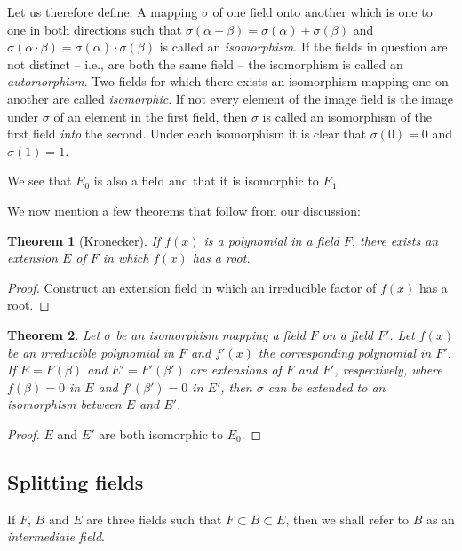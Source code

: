 \documentclass[11pt]{article}
\newtheorem{theo}{Theorem}
\theoremstyle{definition}
\begin{document}
Let us therefore define:
A mapping $\sigma$ of one field onto another which is one to one in both directions such that $\sigma(\alpha + \beta) = \sigma(\alpha) + \sigma(\beta)$ and $\sigma(\alpha \cdot \beta) = \sigma(\alpha) \cdot \sigma(\beta)$ is called an \emph{isomorphism}.
If the fields in question are not distinct -- i.e., are both the same field -- the isomorphism is called an \emph{automorphism}.
Two fields for which there exists an isomorphism mapping one on another are called \emph{isomorphic}.
If not every element of the image field is the image under $\sigma$ of an element in the first field, then $\sigma$ is called an isomorphism of the first field \emph{into} the second.
Under each isomorphism it is clear that $\sigma(0) = 0$ and $\sigma(1) = 1$.

We see that $E_0$ is also a field and that it is isomorphic to $E_1$.

We now mention a few theorems that follow from our discussion:

\begin{theo}[Kronecker]
\label{theo:se}
If $f(x)$ is a polynomial in a field $F$, there exists an extension $E$ of $F$ in which $f(x)$ has a root.
\end{theo}

\begin{proof}
Construct an extension field in which an irreducible factor of $f(x)$ has a root.
\end{proof}

\begin{theo}
\label{theo:ei}
Let $\sigma$ be an isomorphism mapping a field $F$ on a field $F'$.
Let $f(x)$ be an irreducible polynomial in $F$ and $f'(x)$ the corresponding polynomial in $F'$.
If $E = F(\beta)$ and $E' = F'(\beta')$ are extensions of $F$ and $F'$, respectively, where $f(\beta) = 0$ in $E$ and $f'(\beta') = 0$ in $E'$, then $\sigma$ can be extended to an isomorphism between $E$ and $E'$.
\end{theo}

\begin{proof}
$E$ and $E'$ are both isomorphic to $E_0$.
\end{proof}


\subsection{Splitting fields}

If $F$, $B$ and $E$ are three fields such that $F \subset B \subset E$, then we shall refer to $B$ as an \emph{intermediate field}.
\end{document}
